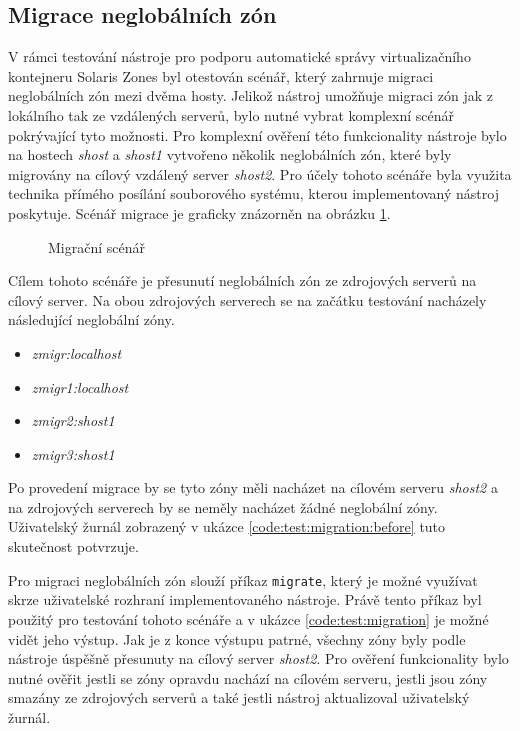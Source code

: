 \subsection{Migrace neglobálních zón}
\label{chapter:testing:scenario:migration}
V rámci testování nástroje pro podporu automatické správy virtualizačního kontejneru Solaris Zones byl otestován scénář, který
zahrnuje migraci neglobálních zón mezi dvěma hosty. Jelikož nástroj umožňuje migraci zón jak z lokálního tak ze vzdálených serverů,
bylo nutné vybrat komplexní scénář pokrývající tyto možnosti. Pro komplexní ověření této funkcionality nástroje bylo na hostech 
\textit{shost} a \textit{shost1} vytvořeno několik neglobálních zón, které byly migrovány na cílový vzdálený server \textit{shost2}. 
Pro účely tohoto scénáře byla využita technika přímého posílání souborového systému, kterou implementovaný nástroj poskytuje.
Scénář migrace je graficky znázorněn na obrázku \ref{image:testing:migration}.
\begin{figure}
    \centering    
    \caption{Migrační scénář}
    \label{image:testing:migration}
\end{figure}

Cílem tohoto scénáře je přesunutí neglobálních zón ze zdrojových serverů na cílový server. Na obou zdrojových serverech se na
začátku testování nacházely následující neglobální zóny.
\begin{itemize}
 \item \textit{zmigr:localhost}
 \item \textit{zmigr1:localhost}
 \item \textit{zmigr2:shost1}
 \item \textit{zmigr3:shost1}
\end{itemize}
Po provedení migrace by se tyto zóny měli nacházet na cílovém serveru \textit{shost2} a na zdrojových serverech by se neměly
nacházet žádné neglobální zóny. Uživatelský žurnál zobrazený v ukázce \ref{code:test:migration:before} tuto skutečnost potvrzuje.
 
Pro migraci neglobálních zón slouží příkaz \verb|migrate|, který je možné využívat skrze uživatelské rozhraní implementovaného
nástroje. Právě tento příkaz byl použitý pro testování tohoto scénáře a v ukázce \ref{code:test:migration} je možné vidět jeho
výstup. Jak je z konce výstupu patrné, všechny zóny byly podle nástroje úspěšně přesunuty na cílový server \textit{shost2}. 
Pro ověření funkcionality bylo nutné ověřit jestli se zóny opravdu nachází na cílovém serveru, jestli jsou zóny smazány
ze zdrojových serverů a také jestli nástroj aktualizoval uživatelský žurnál. 

